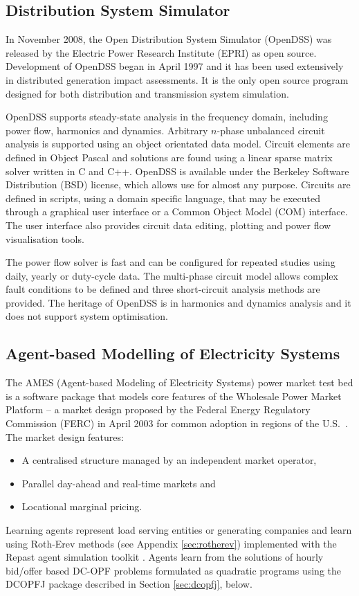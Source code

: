 \subsection*{Distribution System Simulator}
In November 2008, the Open Distribution System Simulator (OpenDSS) was released
by the Electric Power Research Institute (EPRI) as open source.  Development of
OpenDSS began in April 1997 and it has been used extensively in distributed
generation impact assessments.  It is the only open source
program designed for both distribution and transmission system simulation.

OpenDSS supports steady-state analysis in the frequency domain, including power
flow, harmonics and dynamics.  Arbitrary $n$-phase unbalanced circuit analysis
is supported using an object orientated data model.  Circuit elements are defined in Object Pascal and solutions are found using a linear sparse matrix solver written in C and
C++.  OpenDSS is available under the Berkeley Software Distribution (BSD)
license, which allows use for almost any purpose.  Circuits are defined in
scripts, using a domain specific language, that may be executed through a
graphical user interface or a Common Object Model (COM) interface.  The user
interface also provides circuit data editing, plotting and power flow
visualisation tools.

The power flow solver is fast and can be configured for repeated
studies using daily, yearly or duty-cycle data.  The multi-phase circuit model allows
complex fault conditions to be defined and three short-circuit analysis methods
are provided.  The heritage of OpenDSS is in harmonics and dynamics analysis
and it does not support system optimisation.

\subsection*{Agent-based Modelling of Electricity Systems}
\label{sec:ames}
The AMES (Agent-based Modeling of Electricity Systems) power market test bed is
a software package that models core features of the Wholesale Power Market
Platform -- a market design proposed by the Federal Energy Regulatory
Commission (FERC) in April 2003 for common adoption in regions of the
U.S.~\cite{tesfatsi:wpmp}. The market design features:
\begin{itemize}
  \item A centralised structure managed by an independent market operator,
  \item Parallel day-ahead and real-time markets and
  \item Locational marginal pricing.
\end{itemize}
Learning agents represent load serving entities or generating companies and
learn using Roth-Erev methods (see Appendix \ref{sec:rotherev})
implemented with the Repast agent simulation toolkit \cite{gieseler:thesis}.
Agents learn from the solutions of hourly bid/offer based
DC-OPF problems formulated as quadratic programs using the DCOPFJ package
\cite{tesfatsi:dcopf} described in Section \ref{sec:dcopfj}, below.

